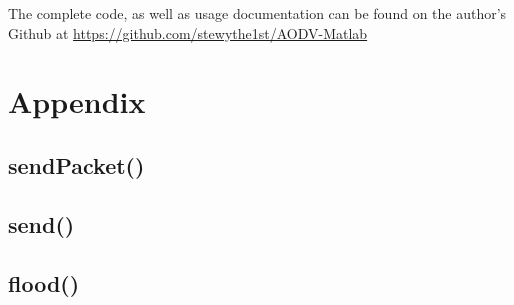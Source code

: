 \documentclass[conference]{IEEEtran}
\begin{document}
The complete code, as well as usage documentation can be found on the author's Github at \url{https://github.com/stewythe1st/AODV-Matlab}




\vfill\null
\pagebreak
\onecolumn

\section{Appendix}

\subsection{sendPacket()}
\label{app:sendPacket}



\subsection{send()}
\label{app:send}



\subsection{flood()}
\label{app:flood}


\end{document}
